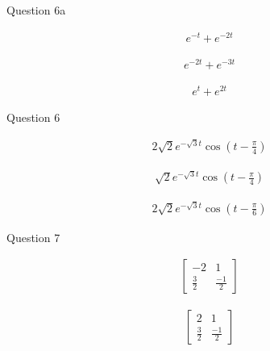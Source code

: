 \documentclass[12pt]{article}
\begin{document}
\vspace{1cm}

Question 6a

\vspace{2cm}

\begin{align*}
    e^{-t} + e^{-2t}
\end{align*}

\vspace{2cm}

\begin{align*}
    e^{-2t} + e^{-3t}
\end{align*}

\vspace{2cm}

\begin{align*}
    e^{t} + e^{2t}
\end{align*}

\vspace{2cm}

Question 6

\vspace{2cm}

\begin{align*}
    2\sqrt{2}e^{-\sqrt{3}t}\cos(t-\frac{\pi}{4})
\end{align*}

\vspace{2cm}

\begin{align*}
    \sqrt{2}e^{-\sqrt{3}t}\cos(t-\frac{\pi}{4})
\end{align*}

\vspace{2cm}

\begin{align*}
    2\sqrt{2}e^{-\sqrt{3}t}\cos(t-\frac{\pi}{6})
\end{align*}

\vspace{2cm}

Question 7 

\begin{align*}
\begin{bmatrix} -2 & 1 \\ \frac{3}{2} & \frac{-1}{2} \end{bmatrix}
\end{align*}

\begin{align*}
    \begin{bmatrix} 2 & 1 \\ \frac{3}{2} & \frac{-1}{2} \end{bmatrix}
\end{align*}
\end{document}
